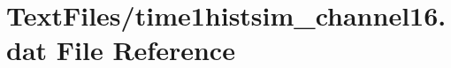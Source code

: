 \hypertarget{TextFiles_2time1histsim__channel16_8dat}{}\section{Text\+Files/time1histsim\+\_\+channel16.dat File Reference}
\label{TextFiles_2time1histsim__channel16_8dat}
